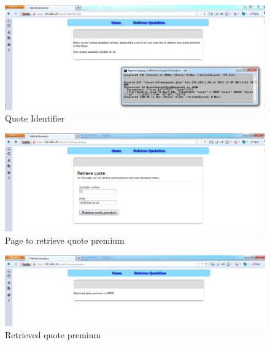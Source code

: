 \documentclass[10pt,a4paper,headinclude=true,twoside]{report}
\begin{document}
\begin{figure}[H]
\centering
\centerline{\includegraphics[scale=0.45]{./QuotationNumber}}
\caption{Quote Identifier}
\label{fig:QuotationNumber}
\end{figure}

\begin{figure}[H]
\centering
\centerline{\includegraphics[scale=0.45]{./retrivequote}}
\caption{Page to retrieve quote premium}
\label{fig:retrivequote}
\end{figure} 

\begin{figure}[H]
\centering
\centerline{\includegraphics[scale=0.45]{./retrievedquote}}
\caption{Retrieved quote premium}
\label{fig:retrievedquote}
\end{figure} 
\end{document}
